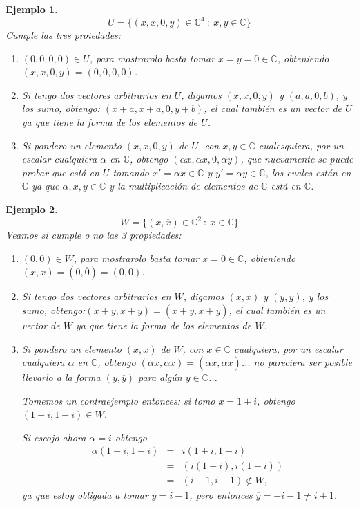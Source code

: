 \documentclass[12pt]{book}
\newtheorem{ejem}{Ejemplo}
\def\C{\mathbb{C}}
\begin{document}
\begin{ejem}{\em
  $$U=\{ (x,x,0,y)\in \C^4\ :\ x,y\in \C\}$$
Cumple las tres proiedades:
\begin{enumerate}
\item $(0,0,0,0)\in U$, para mostrarolo basta tomar $x=y=0\in \C$, obteniendo $(x,x,0,y)=(0,0,0,0)$.
\item Si tengo dos vectores arbitrarios en $U$, digamos $(x,x,0,y)$ y $(a,a,0,b)$, y los sumo, obtengo: $(x+a,x+a,0,y+b)$, el cual también es un vector de $U$ ya que tiene la forma de los elementos de $U$.
\item  Si pondero un elemento $(x,x,0,y)$ de $U$, con $x,y\in\C$ cualesquiera, por un escalar cualquiera $\alpha$ en $\C$, obtengo $(\alpha x,\alpha x ,0,\alpha y)$, que nuevamente se puede probar que está en $U$ tomando $x'=\alpha x\in\C$ y $y'=\alpha y\in\C$, los cuales están en $\C$ ya que $\alpha, x,y\in\C$ y la multiplicación de elementos de $\C$ está en $\C$.
\end{enumerate}}
\end{ejem}
\begin{ejem}{\em
  $$W=\{ (x,\overline{x})\in\C^2\ :\ x\in \C\}$$
  Veamos si cumple o no las 3 propiedades:
  \begin{enumerate}
\item $(0,0)\in W$, para mostrarolo basta tomar $x=0\in \C$, obteniendo $(x,\overline{x})=(0,\overline{0})=(0,0)$.
\item Si tengo dos vectores arbitrarios en $W$, digamos $(x,\overline{x})$ y $(y,\overline{y})$, y los sumo, obtengo:\break $(x+y,\overline{x}+\overline{y})=(x+y,\overline{x+y})$, el cual también es un vector de $W$ ya que tiene la forma de los elementos de $W$.
\item  Si pondero un elemento $(x,\overline{x})$ de $W$, con $x\in\C$ cualquiera, por un escalar cualquiera $\alpha$ en $\C$, obtengo $(\alpha x,\alpha \overline{x})=(\alpha x,\overline{\overline{\alpha}x})$... no pareciera ser posible llevarlo a la forma $(y,\overline{y})$ para algún $y\in\C$...

  Tomemos un contraejemplo entonces: si tomo $x=1+i$, obtengo $(1+i,1-i)\in W$.

  Si escojo ahora $\alpha=i$ obtengo
  \begin{eqnarray*}
    \alpha(1+i,1-i)&=&i(1+i,1-i)\\
    &=&(i(1+i),i(1-i))\\
    &=&(i-1,i+1)\not\in W,
  \end{eqnarray*}
  ya que estoy obligada a tomar $y=i-1$, pero entonces $\overline{y}=-i-1\not=i+1$.
\end{enumerate}
}
\end{ejem}
\end{document}
